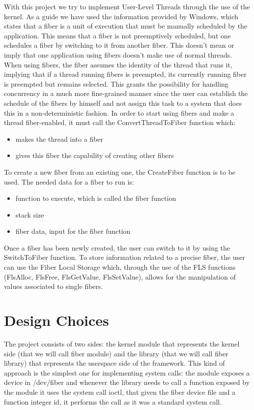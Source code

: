 \documentclass[a4paper,10pt]{article}
\begin{document}
With this project we try to implement User-Level Threads through the use of the kernel. As a guide we have used the information provided by Windows, which states that a fiber is a unit of execution that must be manually scheduled by the application. This means that a fiber is not preemptively scheduled, but one schedules a fiber by switching to it from another fiber. This doesn’t mean or imply that one application using fibers doesn’t make use of normal threads. When using fibers, the fiber assumes the identity of the thread that runs it, implying that if a thread running fibers is preempted, its currently running fiber is preempted but remains selected. This grants the possibility for handling concurrency in a much more fine-grained manner since the user can establish the schedule of the fibers by himself and not assign this task to a system that does this in a non-deterministic fashion.
In order to start using fibers and make a thread fiber-enabled, it must call the ConvertThreadToFiber function which:
\begin{itemize}
	\item makes the thread into a fiber
	\item gives this fiber the capability of creating other fibers
\end{itemize}
To create a new fiber from an existing one, the CreateFiber function is to be used. The needed data for a fiber to run is:
\begin{itemize}
	\item function to execute, which is called the fiber function
	\item stack size
	\item fiber data, input for the fiber function
\end{itemize}

Once a fiber has been newly created, the user can switch to it by using the SwitchToFiber function.
To store information related to a precise fiber, the user can use the Fiber Local Storage which, through the use of the FLS functions (FlsAlloc, FlsFree, FlsGetValue, FlsSetValue), allows for the manipulation of values associated to single fibers.

\section{Design Choices}
The project consists of two sides: the kernel module that represents the kernel side (that we will call fiber module) and the library (that we will call fiber library) that represents the userspace side of the framework. This kind of approach is the simplest one for implementing system calls: the module exposes a device in /dev/fiber and whenever the library needs to call a function exposed by the module it uses the system call ioctl, that given the fiber device file and a function integer id, it performs the call as it was a standard system call.
\end{document}
